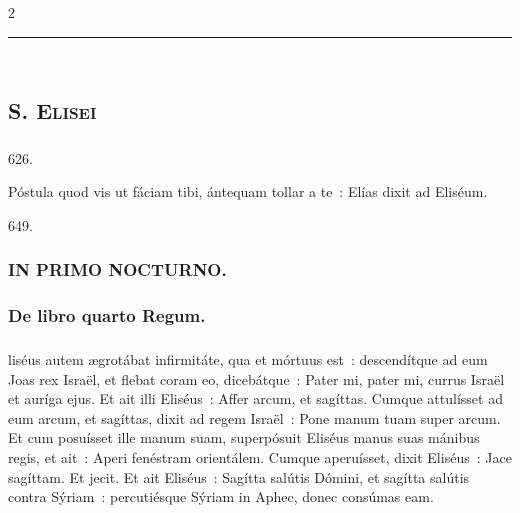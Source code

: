\documentclass[9pt,twoside]{extarticle}
\begin{document}
\begin{multicols}{2}
{\begin{center}\textcolor{red}{\rule{\linewidth}{0.5pt}} \end{center}

\subsection*{\center \textsc{\\
S. Elisei}}
\subsubsection*{\center {}}

\begin{tightlist}{}
\item {} 626. 
\item {} Póstula quod vis ut fáciam tibi, ántequam tollar a te~: Elías dixit ad Eliséum. 
\item {}
\item {} 649.
\end{tightlist}

\subsubsection*{\center \textsc{IN PRIMO NOCTURNO.}}
\subsubsection*{\center De libro quarto Regum.}
\subsubsection*{\center {}}
liséus autem ægrotábat infirmitáte, qua et mórtuus est~: descendítque ad eum Joas rex Israël, et flebat coram eo, dicebátque~: Pater mi, pater mi, currus Israël et auríga ejus.
Et ait illi Eliséus~: Affer arcum, et sagíttas. Cumque attulísset ad eum arcum, et sagíttas,
dixit ad regem Israël~: Pone manum tuam super arcum. Et cum posuísset ille manum suam, superpósuit Eliséus manus suas mánibus regis,
et ait~: Aperi fenéstram orientálem. Cumque aperuísset, dixit Eliséus~: Jace sagíttam. Et jecit. Et ait Eliséus~: Sagítta salútis Dómini, et sagítta salútis contra Sýriam~: percutiésque Sýriam in Aphec, donec consúmas eam.

}
\end{multicols}
\end{document}
